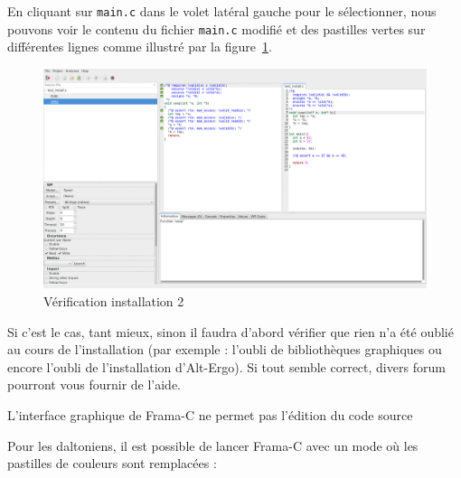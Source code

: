 \documentclass[12pt,francais,]{scrbook}
\newenvironment{Shaded}{}{}
\newcommand{\KeywordTok}[1]{\textcolor[rgb]{0.00,0.44,0.13}{\textbf{{#1}}}}
\newenvironment{zdsalertblock}[1]{%
  \tcolorbox[beamer,%
    noparskip,breakable,
    colback=LightCoral,colframe=DarkRed,%
    colbacklower=Tomato,%
    title=#1]
}{\endtcolorbox}
\newenvironment{zdsblock}[1]{%
  \tcolorbox[beamer,%
    noparskip,breakable,
    colback=LightBlue,colframe=DarkBlue,%
    colbacklower=DarkBlue,%
    title=#1]
}{\endtcolorbox}
\begin{document}
En cliquant sur \texttt{main.c} dans le volet latéral gauche pour le
sélectionner, nous pouvons voir le contenu du fichier \texttt{main.c}
modifié et des pastilles vertes sur différentes lignes comme
illustré par la figure~\ref{fig:install-2}.

\begin{figure}[htbp]
\centering
\includegraphics[scale=0.5]{1-2-verif_install-2.png}
\caption{Vérification installation 2}
\label{fig:install-2}
\end{figure}

Si c'est le cas, tant mieux, sinon il faudra d'abord vérifier que rien
n'a été oublié au cours de l'installation (par exemple : l'oubli de
bibliothèques graphiques ou encore l'oubli de l'installation
d'Alt-Ergo). Si tout semble correct, divers forum pourront vous fournir
de l'aide.

\begin{zdsalertblock}{Attention}
  L'interface graphique de Frama-C ne permet pas l'édition du code source
\end{zdsalertblock}

\begin{zdsblock}{Information}
  Pour les daltoniens, il est possible de lancer Frama-C avec un mode où
  les pastilles de couleurs sont remplacées :
  \begin{footnotesize}\begin{Shaded}
  \end{Shaded}\end{footnotesize}
\end{zdsblock}
\end{document}
